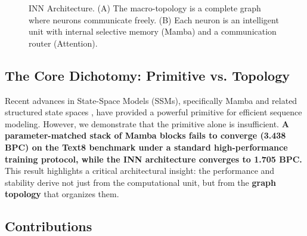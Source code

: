 \documentclass{article}
\begin{document}
\begin{figure}[H]
\caption{INN Architecture. (A) The macro-topology is a complete graph where neurons communicate freely. (B) Each neuron is an intelligent unit with internal selective memory (Mamba) and a communication router (Attention).}
\label{fig:architecture}
\end{figure}

\subsection{The Core Dichotomy: Primitive vs. Topology}

Recent advances in State-Space Models (SSMs), specifically Mamba \cite{gu2023mamba} and related structured state spaces \cite{gu2021efficiently, dao2022hungry, poli2023hyena}, have provided a powerful primitive for efficient sequence modeling. However, we demonstrate that the primitive alone is insufficient. \textbf{A parameter-matched stack of Mamba blocks fails to converge (3.438 BPC) on the Text8 benchmark under a standard high-performance training protocol, while the INN architecture converges to 1.705 BPC.} This result highlights a critical architectural insight: the performance and stability derive not just from the computational unit, but from the \textbf{graph topology} that organizes them.

\subsection{Contributions}
\end{document}
